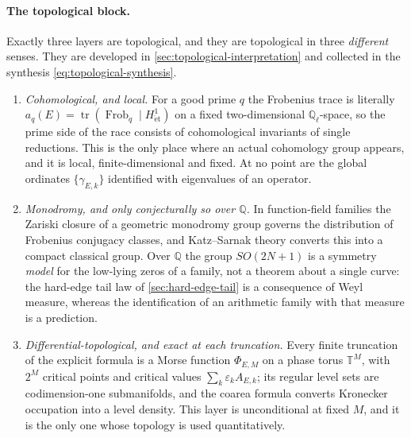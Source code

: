 \documentclass[11pt,reqno]{amsart}
\theoremstyle{remark}
\newcommand{\Q}{\mathbb{Q}}
\newcommand{\T}{\mathbb{T}}
\begin{document}
\paragraph{The topological block.}
Exactly three layers are topological, and they are topological in three \emph{different} senses.  They are developed in \cref{sec:topological-interpretation} and collected in the synthesis \eqref{eq:topological-synthesis}.

\begin{enumerate}[label=\textbf{(T\arabic*)},leftmargin=2.9em]
  \item \emph{Cohomological, and local.}  For a good prime $q$ the Frobenius trace is literally $a_q(E)=\operatorname{tr}(\operatorname{Frob}_q\mid H^1_{\mathrm{\acute et}})$ on a fixed two-dimensional $\Q_\ell$-space, so the prime side of the race consists of cohomological invariants of single reductions.  This is the only place where an actual cohomology group appears, and it is local, finite-dimensional and fixed.  At no point are the global ordinates $\{\gamma_{E,k}\}$ identified with eigenvalues of an operator.
  \item \emph{Monodromy, and only conjecturally so over $\Q$.}  In function-field families the Zariski closure of a geometric monodromy group governs the distribution of Frobenius conjugacy classes, and Katz--Sarnak theory converts this into a compact classical group.  Over $\Q$ the group $SO(2N+1)$ is a symmetry \emph{model} for the low-lying zeros of a family, not a theorem about a single curve: the hard-edge tail law of \cref{sec:hard-edge-tail} is a consequence of Weyl measure, whereas the identification of an arithmetic family with that measure is a prediction.
  \item \emph{Differential-topological, and exact at each truncation.}  Every finite truncation of the explicit formula is a Morse function $\Phi_{E,M}$ on a phase torus $\T^M$, with $2^M$ critical points and critical values $\sum_k\varepsilon_kA_{E,k}$; its regular level sets are codimension-one submanifolds, and the coarea formula converts Kronecker occupation into a level density.  This layer is unconditional at fixed $M$, and it is the only one whose topology is used quantitatively.
\end{enumerate}
\end{document}
